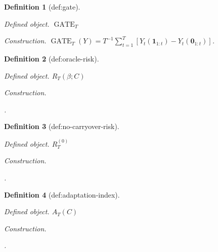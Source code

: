 \documentclass{article}
\newtheorem{definition}{Definition}
\begin{document}
\begin{definition}[def:gate]\label{def:gate}
\par\smallskip\noindent\emph{Defined object.} \(\operatorname{GATE}_T\)
\par\smallskip\noindent\emph{Construction.} \(\operatorname{GATE}_T(Y)=T^{-1}\sum_{t=1}^T[Y_t(\mathbf1_{1:t})-Y_t(\mathbf0_{1:t})]\).
\end{definition}

\begin{definition}[def:oracle-risk]\label{def:oracle-risk}
\par\smallskip\noindent\emph{Defined object.} \(R_T(\beta;C)\)
\par\smallskip\noindent\emph{Construction.} \leavevmode\par\noindent {}\par\noindent.
\end{definition}

\begin{definition}[def:no-carryover-risk]\label{def:no-carryover-risk}
\par\smallskip\noindent\emph{Defined object.} \(R_T^{(0)}\)
\par\smallskip\noindent\emph{Construction.} \leavevmode\par\noindent {}\par\noindent.
\end{definition}

\begin{definition}[def:adaptation-index]\label{def:adaptation-index}
\par\smallskip\noindent\emph{Defined object.} \(A_T(C)\)
\par\smallskip\noindent\emph{Construction.} \leavevmode\par\noindent {}\par\noindent.
\end{definition}
\end{document}
